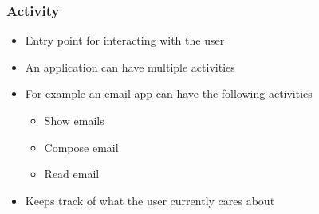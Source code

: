 %
%
%

\begin{frame}
  \frametitle{Activity}
  
  \begin{itemize}
  \item<1-> Entry point for interacting with the user
  \item<2-> An application can have multiple activities
  
  \item<2->[] For example an email app can have the following activities 
    \begin{itemize}
    \item Show emails
    \item Compose email
    \item Read email
    \end{itemize}
        
  \item<4-> Keeps track of what the user currently cares about

  \end{itemize}

\end{frame}


